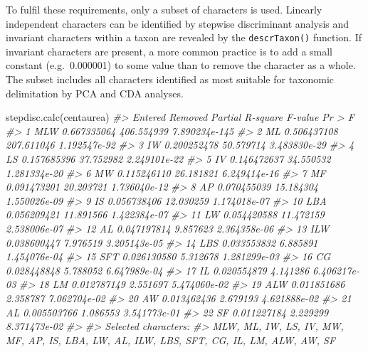 \documentclass[
  11pt,
  a4paper]{article}
\newenvironment{Shaded}{\begin{snugshade}}{\end{snugshade}}
\newcommand{\CommentTok}[1]{\textcolor[rgb]{0.56,0.35,0.01}{\textit{#1}}}
\newcommand{\FunctionTok}[1]{\textcolor[rgb]{0.00,0.00,0.00}{#1}}
\newcommand{\NormalTok}[1]{#1}
\begin{document}
To fulfil these requirements, only a subset of characters is used.
Linearly independent characters can be identified by stepwise
discriminant analysis and invariant characters within a taxon are
revealed by the \texttt{descrTaxon()} function. If invariant characters
are present, a more common practice is to add a small constant
(e.g.~0.000001) to some value than to remove the character as a whole.
The subset includes all characters identified as most suitable for
taxonomic delimitation by PCA and CDA analyses.

\begin{Shaded}
\begin{Highlighting}[]
\FunctionTok{stepdisc.calc}\NormalTok{(centaurea)}
\CommentTok{\#\textgreater{}    Entered Removed Partial R{-}square    F{-}value        Pr \textgreater{} F}
\CommentTok{\#\textgreater{} 1      MLW              0.667335064 406.554939 7.890234e{-}145}
\CommentTok{\#\textgreater{} 2       ML              0.506437108 207.611046  1.192547e{-}92}
\CommentTok{\#\textgreater{} 3       IW              0.200252478  50.579714  3.483830e{-}29}
\CommentTok{\#\textgreater{} 4       LS              0.157685396  37.752982  2.249101e{-}22}
\CommentTok{\#\textgreater{} 5       IV              0.146472637  34.550532  1.281334e{-}20}
\CommentTok{\#\textgreater{} 6       MW              0.115246110  26.181821  6.249414e{-}16}
\CommentTok{\#\textgreater{} 7       MF              0.091473201  20.203721  1.736040e{-}12}
\CommentTok{\#\textgreater{} 8       AP              0.070455039  15.184304  1.550026e{-}09}
\CommentTok{\#\textgreater{} 9       IS              0.056738406  12.030259  1.174018e{-}07}
\CommentTok{\#\textgreater{} 10     LBA              0.056209421  11.891566  1.422384e{-}07}
\CommentTok{\#\textgreater{} 11      LW              0.054420588  11.472159  2.538006e{-}07}
\CommentTok{\#\textgreater{} 12      AL              0.047197814   9.857623  2.364358e{-}06}
\CommentTok{\#\textgreater{} 13     ILW              0.038600447   7.976519  3.205143e{-}05}
\CommentTok{\#\textgreater{} 14     LBS              0.033553832   6.885891  1.454076e{-}04}
\CommentTok{\#\textgreater{} 15     SFT              0.026130580   5.312678  1.281299e{-}03}
\CommentTok{\#\textgreater{} 16      CG              0.028448848   5.788052  6.647989e{-}04}
\CommentTok{\#\textgreater{} 17      IL              0.020554879   4.141286  6.406217e{-}03}
\CommentTok{\#\textgreater{} 18      LM              0.012787149   2.551697  5.474060e{-}02}
\CommentTok{\#\textgreater{} 19     ALW              0.011851686   2.358787  7.062704e{-}02}
\CommentTok{\#\textgreater{} 20      AW              0.013462436   2.679193  4.621888e{-}02}
\CommentTok{\#\textgreater{} 21              AL      0.005503766   1.086553  3.541773e{-}01}
\CommentTok{\#\textgreater{} 22      SF              0.011227184   2.229299  8.371473e{-}02}
\CommentTok{\#\textgreater{} }
\CommentTok{\#\textgreater{} Selected characters:}
\CommentTok{\#\textgreater{} MLW, ML, IW, LS, IV, MW, MF, AP, IS, LBA, LW, AL, ILW, LBS, SFT, CG, IL, LM, ALW, AW, SF}


\end{Highlighting}
\end{Shaded}
\end{document}
